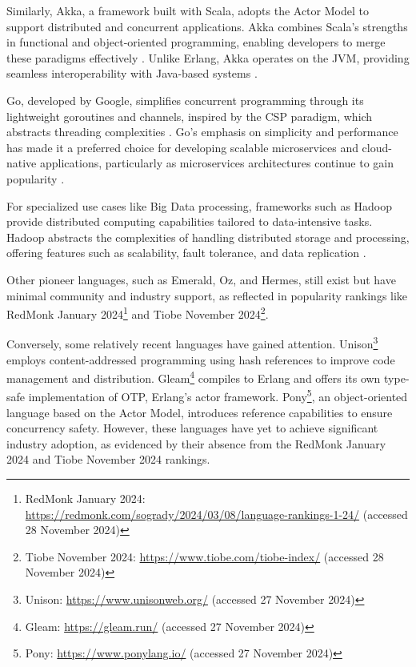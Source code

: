 Similarly, Akka, a framework built with Scala, adopts the Actor Model to support distributed and concurrent applications. Akka combines Scala’s strengths in functional and object-oriented programming, enabling developers to merge these paradigms effectively \cite{Valkov2018}. Unlike Erlang, Akka operates on the \gls{JVM}, providing seamless interoperability with Java-based systems \cite{Abraham2023}.

Go, developed by Google, simplifies concurrent programming through its lightweight goroutines and channels, inspired by the \gls{CSP} paradigm, which abstracts threading complexities \cite{Brolos2021}. Go’s emphasis on simplicity and performance has made it a preferred choice for developing scalable microservices and cloud-native applications, particularly as microservices architectures continue to gain popularity \cite{go-docs}.

For specialized use cases like Big Data processing, frameworks such as Hadoop provide distributed computing capabilities tailored to data-intensive tasks. Hadoop abstracts the complexities of handling distributed storage and processing, offering features such as scalability, fault tolerance, and data replication \cite{Polato2014}.

Other pioneer languages, such as Emerald, Oz, and Hermes, still exist but have minimal community and industry support, as reflected in popularity rankings like RedMonk January 2024\footnote{RedMonk January 2024: \url{https://redmonk.com/sogrady/2024/03/08/language-rankings-1-24/} (accessed 28 November 2024)} and Tiobe November 2024\footnote{Tiobe November 2024: \url{https://www.tiobe.com/tiobe-index/} (accessed 28 November 2024)}.

Conversely, some relatively recent languages have gained attention. Unison\footnote{Unison: \url{https://www.unisonweb.org/} (accessed 27 November 2024)} employs content-addressed programming using hash references to improve code management and distribution. Gleam\footnote{Gleam: \url{https://gleam.run/} (accessed 27 November 2024)} compiles to Erlang and offers its own type-safe implementation of \gls{OTP}, Erlang’s actor framework. Pony\footnote{Pony: \url{https://www.ponylang.io/} (accessed 27 November 2024)}, an object-oriented language based on the Actor Model, introduces reference capabilities to ensure concurrency safety. However, these languages have yet to achieve significant industry adoption, as evidenced by their absence from the RedMonk January 2024 and Tiobe November 2024 rankings.

